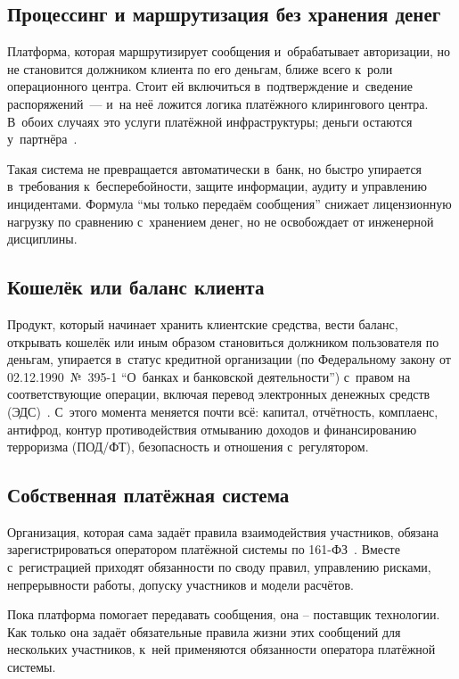 \subsection*{Процессинг и маршрутизация без хранения денег}

Платформа, которая маршрутизирует сообщения и~обрабатывает авторизации, но не становится должником клиента по его деньгам, ближе всего к~роли операционного центра. Стоит ей включиться в~подтверждение и~сведение распоряжений~--- и~на неё ложится логика платёжного клирингового центра. В~обоих случаях это услуги платёжной инфраструктуры; деньги остаются у~партнёра~\cite{fz-161}.

Такая система не превращается автоматически в~банк, но быстро упирается в~требования к~бесперебойности, защите информации, аудиту и управлению инцидентами. Формула \enquote{мы только передаём сообщения} снижает лицензионную нагрузку по сравнению с~хранением денег, но не освобождает от инженерной дисциплины.

\subsection*{Кошелёк или баланс клиента}

Продукт, который начинает хранить клиентские средства, вести баланс, открывать кошелёк или иным образом становиться должником пользователя по деньгам, упирается в~статус кредитной организации (по Федеральному закону от 02.12.1990~№~395-1 \enquote{О~банках и банковской деятельности}) с~правом на соответствующие операции, включая перевод электронных денежных средств (ЭДС)~\cite{fz-161,fz-395-1}.
С~этого момента меняется почти всё: капитал, отчётность, комплаенс, антифрод, контур противодействия отмыванию доходов и финансированию терроризма (ПОД/ФТ), безопасность и отношения с~регулятором.

\subsection*{Собственная платёжная система}

Организация, которая сама задаёт правила взаимодействия участников, обязана зарегистрироваться оператором платёжной системы по 161-ФЗ~\cite{fz-161}. Вместе с~регистрацией приходят обязанности по своду правил, управлению рисками, непрерывности работы, допуску участников и модели расчётов.

Пока платформа помогает передавать сообщения, она -- поставщик технологии. Как только она задаёт обязательные правила жизни этих сообщений для нескольких участников, к~ней применяются обязанности оператора платёжной системы.

